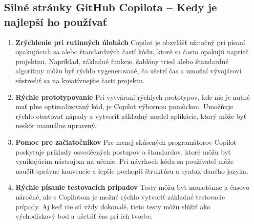 \documentclass[10pt,oneside,slovak,a4paper, onecolumn]{article}
\begin{document}
\subsection{Silné stránky GitHub Copilota – Kedy je najlepší ho používať}
\begin{enumerate}
    \item \textbf{Zrýchlenie pri rutinných úlohách}
    Copilot je obzvlášť užitočný pri písaní opakujúcich sa alebo štandardných častí kódu, ktoré sa často opakujú naprieč projektmi. Napríklad, základné funkcie, šablóny tried alebo štandardné algoritmy môžu byť rýchlo vygenerované, čo ušetrí čas a umožní vývojárovi sústrediť sa na kreatívnejšie časti projektu.
    \item \textbf{Rýchle prototypovanie}
    Pri vytváraní rýchlych prototypov, kde nie je nutné mať plne optimalizovaný kód, je Copilot výbornou pomôckou. Umožňuje rýchlo otestovať nápady a vytvoriť základný model aplikácie, ktorý môže byť neskôr manuálne upravený.
    \item \textbf{Pomoc pre začiatočníkov}
    Pre menej skúsených programátorov Copilot poskytuje príklady osvedčených postupov a štandardov, ktoré môžu byť vynikajúcim nástrojom na učenie. Pri návrhoch kódu sa používateľ môže naučiť správne konvencie a lepšie pochopiť štruktúru a syntax daného jazyka.
    \item \textbf{Rýchle písanie testovacích prípadov}
    Testy môžu byť monotónne a časovo náročné, ale s Copilotom je možné rýchlo vytvoriť základné testovacie prípady. Aj keď nie sú vždy dokonalé, tieto testy môžu slúžiť ako východiskový bod a ušetriť čas pri ich tvorbe.
\end{enumerate}
\end{document}
